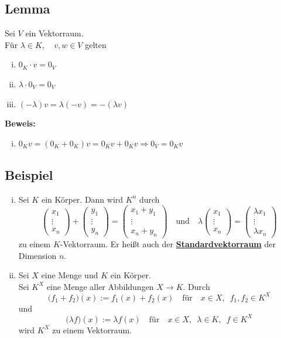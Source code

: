 \subsection{Lemma}
Sei $V$ ein Vektorraum. \\
Für $\lambda \in K, \quad v,w \in V$ gelten
\begin{enumerate}[i)]
\item $0_K \cdot v = 0_V$
\item $\lambda \cdot 0_V = 0_V$
\item $(-\lambda) v = \lambda (-v) = -(\lambda v)$
\end{enumerate}
\textbf{Beweis:}
\begin{enumerate}[i)]
\item $0_K v =(0_K + 0_K) v = 0_K v + 0_K v \Rightarrow 0_V = 0_K v$
\end{enumerate}

\subsection{Beispiel}
\begin{enumerate}[i)]
\item Sei $K$ ein Körper. Dann wird $K^n$ durch 
\[
\begin{pmatrix}
x_1 \\ \vdots \\ x_n
\end{pmatrix}
+
\begin{pmatrix}
y_1 \\ \vdots \\ y_n
\end{pmatrix}
=
\begin{pmatrix}
x_1 +y_1 \\ \vdots \\ x_n +y_n
\end{pmatrix}
\quad \text{und} \quad \lambda 
\begin{pmatrix}
x_1 \\ \vdots \\ x_n
\end{pmatrix}
=
\begin{pmatrix}
\lambda x_1 \\ \vdots \\ \lambda x_n
\end{pmatrix}
\]
zu einem $K$-Vektorraum. Er heißt auch der \underline{\textbf{Standardvektorraum}} der Dimension $n$.

\item Sei $X$ eine Menge und $K$ ein Körper. \\
Sei $K^X$ eine Menge aller Abbildungen $ X \to K$. Durch
\[
\big(f_1 + f_2 \big) (x) := f_1 (x) + f_2 (x) \quad \text{für} \quad x \in X , \enspace f_1, f_2 \in K^X
\]
und
\[
\big(\lambda f \big) (x) := \lambda f(x) \quad \text{für} \quad x \in X, \enspace \lambda \in K, \enspace f \in K^X
\]
wird $K^X$ zu einem Vektorraum.
\end{enumerate}

